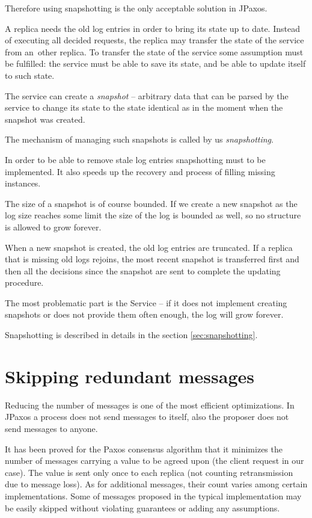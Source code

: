 Therefore using snapshotting is the only acceptable solution in JPaxos.


A replica needs the old log entries in order to bring its state up to date. Instead of executing all decided requests, the replica may transfer the state of the service from an~other replica. To transfer the state of the service some assumption must be fulfilled: the service must be able to save its state, and be able to update itself to such state.

The service can create a \textit{snapshot} -- arbitrary data that can be parsed by the service to change its state to the state identical as in the moment when the snapshot was created.

The mechanism of managing such snapshots is called by us \textit{snapshotting}.

In order to be able to remove stale log entries snapshotting must to be implemented. It also speeds up the recovery and process of filling missing instances.

The size of a snapshot is of course bounded. If we create a new snapshot as the log size reaches some limit the size of the log is bounded as well, so no structure is allowed to grow forever.

When a new snapshot is created, the old log entries are truncated. If a replica that is missing old logs rejoins, the most recent snapshot is transferred first and then all the decisions since the snapshot are sent to complete the updating procedure.

The most problematic part is the Service -- if it does not implement creating snapshots or does not provide them often enough, the log will grow forever.

Snapshotting is described in details in the section \ref{sec:snapshotting}.

\section{Skipping redundant messages}
Reducing the number of messages is one of the most efficient optimizations. In JPaxos a process does not send messages to itself, also the proposer does not send \accept messages to anyone.

It has been proved for the Paxos consensus algorithm that it minimizes the number of messages carrying a value to be agreed upon (the client request in our case). The value is sent only once to each replica (not counting retransmission due to message loss). As for additional messages, their count varies among certain implementations. Some of messages proposed in the typical implementation may be easily skipped without violating guarantees or adding any assumptions.

